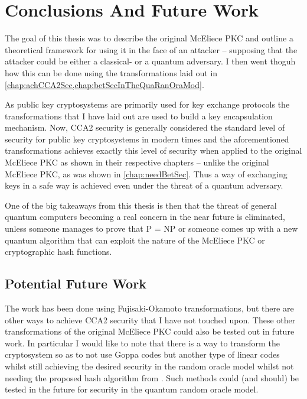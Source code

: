 
\chapter{Conclusions And Future Work}

The goal of this thesis was to describe the original McEliece PKC and outline a theoretical framework for using it in the face of an attacker -- supposing that the attacker could be either a classical- or a quantum adversary. I then went thoguh how this can be done using the transformations laid out in \cref{chap:achCCA2Sec,chap:betSecInTheQuaRanOraMod}.

As public key cryptosystems are primarily used for key exchange protocols the transformations that I have laid out are used to build a key encapsulation mechanism. Now, CCA2 security is generally considered the standard level of security for public key cryptosystems in modern times and the aforementioned transformations achieves exactly this level of security when applied to the original McEliece PKC as shown in their respective chapters -- unlike the original McEliece PKC, as was shown in \cref{chap:needBetSec}. Thus a way of exchanging keys in a safe way is achieved even under the threat of a quantum adversary.

One of the big takeaways from this thesis is then that the threat of general quantum computers becoming a real concern in the near future is eliminated, unless someone manages to prove that P = NP or someone comes up with a new quantum algorithm that can exploit the nature of the McEliece PKC or cryptographic hash functions.


\section{Potential Future Work}

The work has been done using Fujisaki-Okamoto transformations, but there are other ways to achieve CCA2 security that I have not touched upon. These other transformations of the original McEliece PKC could also be tested out in future work. In particular I would like to note that there is a way to transform the cryptosystem so as to not use Goppa codes but another type of linear codes whilst still achieving the desired security in the random oracle model whilst not needing the proposed hash algorithm from \cite{BP} \cite{CHP}. Such methods could (and should) be tested in the future for security in the quantum random oracle model.

